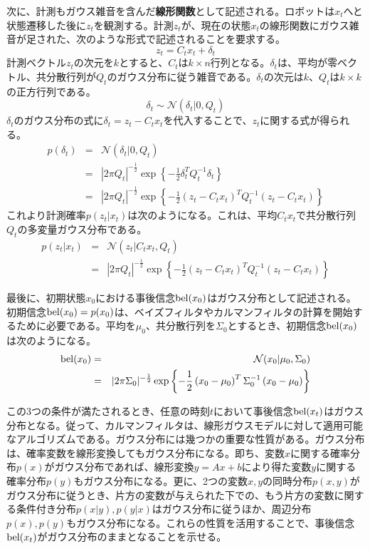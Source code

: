 \documentclass[dvipdfmx,a4paper]{jsarticle}
\begin{document}
次に、計測もガウス雑音を含んだ\textbf{線形関数}として記述される。ロボットは$x_t$へと状態遷移した後に$z_t$を観測する。計測$z_t$が、現在の状態$x_t$の線形関数にガウス雑音が足された、次のような形式で記述されることを要求する。
\begin{equation}
	z_t = C_t x_t + \delta_t
\end{equation}
計測ベクトル$z_t$の次元を$k$とすると、$C_t$は$k \times n$行列となる。$\delta_t$は、平均が零ベクトル、共分散行列が$Q_t$のガウス分布に従う雑音である。$\delta_t$の次元は$k$、$Q_t$は$k \times k$の正方行列である。
\begin{equation}
	\delta_t \sim \mathcal{N}(\delta_t | 0, Q_t)
\end{equation}
$\delta_t$のガウス分布の式に$\delta_t = z_t - C_t x_t$を代入することで、$z_t$に関する式が得られる。
\begin{eqnarray}
	p(\delta_t) &=& \mathcal{N}(\delta_t | 0, Q_t) \nonumber \\
	&=& |2 \pi Q_t|^{-\frac{1}{2}} \exp \left\{ -\frac{1}{2} \delta_t^T Q_t^{-1} \delta_t \right\} \\
	&=& |2 \pi Q_t|^{-\frac{1}{2}} \exp \left\{ -\frac{1}{2} \left( z_t - C_t x_t \right)^T Q_t^{-1} \left( z_t - C_t x_t \right) \right\}
\end{eqnarray}
これより計測確率$p(z_t | x_t)$は次のようになる。これは、平均$C_t x_t$で共分散行列$Q_t$の多変量ガウス分布である。
\begin{eqnarray}
	p(z_t | x_t) &=& \mathcal{N}(z_t | C_t x_t, Q_t) \\
	&=& |2 \pi Q_t|^{-\frac{1}{2}} \exp \left\{ -\frac{1}{2} \left( z_t - C_t x_t \right)^T Q_t^{-1} \left( z_t - C_t x_t \right) \right\}
\end{eqnarray}

最後に、初期状態$x_0$における事後信念$\operatorname{bel}(x_0)$はガウス分布として記述される。初期信念$\operatorname{bel}(x_0) = p(x_0)$は、ベイズフィルタやカルマンフィルタの計算を開始するために必要である。平均を$\mu_0$、共分散行列を$\Sigma_0$とするとき、初期信念$\operatorname{bel}(x_0)$は次のようになる。
\begin{eqnarray}
	\operatorname{bel}(x_0) &=& \mathcal{N}(x_0 | \mu_0, \Sigma_0) \\
	&=& |2 \pi \Sigma_0|^{-\frac{1}{2}} \exp \left\{ -\frac{1}{2} \left( x_0 - \mu_0 \right)^T \Sigma_0^{-1} \left( x_0 - \mu_0 \right) \right\}
\end{eqnarray}

この3つの条件が満たされるとき、任意の時刻$t$において事後信念$\operatorname{bel}(x_t)$はガウス分布となる。従って、カルマンフィルタは、線形ガウスモデルに対して適用可能なアルゴリズムである。ガウス分布には幾つかの重要な性質がある。ガウス分布は、確率変数を線形変換してもガウス分布になる。即ち、変数$x$に関する確率分布$p(x)$がガウス分布であれば、線形変換$y = Ax + b$により得た変数$y$に関する確率分布$p(y)$もガウス分布になる。更に、2つの変数$x, y$の同時分布$p(x, y)$がガウス分布に従うとき、片方の変数が与えられた下での、もう片方の変数に関する条件付き分布$p(x | y), p(y | x)$はガウス分布に従うほか、周辺分布$p(x), p(y)$もガウス分布になる。これらの性質を活用することで、事後信念$\operatorname{bel}(x_t)$がガウス分布のままとなることを示せる。
\end{document}
